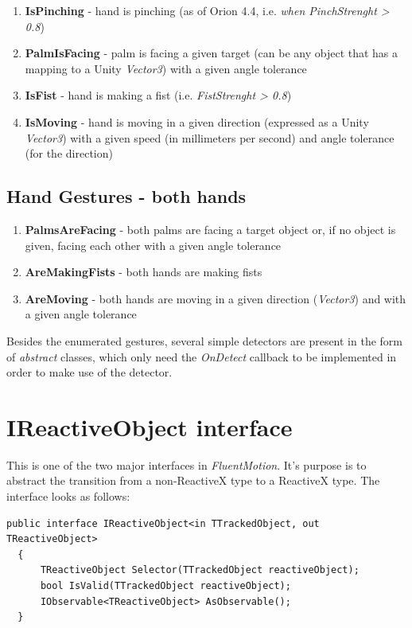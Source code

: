 \documentclass[12pt,a4paper,twoside]{report}
\begin{document}
\begin{enumerate}
  \item \textbf{IsPinching} - hand is pinching (as of Orion 4.4, i.e. \textit{when PinchStrenght > 0.8})
  \item \textbf{PalmIsFacing} - palm is facing a given target (can be any object that has a mapping to a Unity \textit{Vector3}) with a given angle tolerance
  \item  \textbf{IsFist} - hand is making a fist (i.e. \textit{FistStrenght > 0.8})
  \item \textbf{IsMoving} - hand is moving in a given direction (expressed as a Unity \textit{Vector3}) with a given speed (in millimeters per second) and angle tolerance (for the direction) 
\end{enumerate}

\subsection{Hand Gestures - both hands}
\begin{enumerate}
  \item \textbf{PalmsAreFacing} - both palms are facing a target object or, if no object is given, facing each other with a given angle tolerance
  \item \textbf{AreMakingFists} - both hands are making fists
  \item \textbf{AreMoving} - both hands are moving in a given direction (\textit{Vector3}) and with a given angle tolerance
\end{enumerate}

Besides the enumerated gestures, several simple detectors are present in the form of \textit{abstract} classes, which only need the \textit{OnDetect} callback to be implemented in order to make use of the detector.


\section{IReactiveObject interface}
This is one of the two major interfaces in \textit{FluentMotion}. It's purpose is to abstract the transition from a non-ReactiveX type to a ReactiveX type. The interface looks as follows:

\begin{lstlisting}[caption=IReactiveObject interface]
  public interface IReactiveObject<in TTrackedObject, out TReactiveObject>
  {
      TReactiveObject Selector(TTrackedObject reactiveObject);
      bool IsValid(TTrackedObject reactiveObject);
      IObservable<TReactiveObject> AsObservable();
  }
\end{lstlisting}
\end{document}
